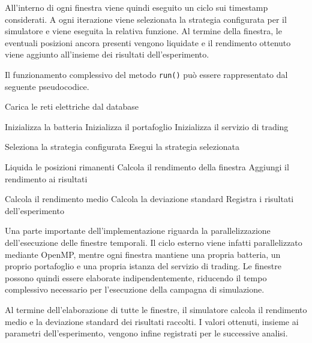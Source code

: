 \documentclass[a4paper,oneside,italian]{sapthesis}
\begin{document}
All'interno di ogni finestra viene quindi eseguito un ciclo sui timestamp
considerati. A ogni iterazione viene selezionata la strategia configurata
per il simulatore e viene eseguita la relativa funzione. Al termine della
finestra, le eventuali posizioni ancora presenti vengono liquidate e il
rendimento ottenuto viene aggiunto all'insieme dei risultati dell'esperimento.

Il funzionamento complessivo del metodo \texttt{run()} può essere
rappresentato dal seguente pseudocodice.

\begin{algorithm}[H]
\caption{Esecuzione della simulazione}
\label{alg:simulator-run}
\begin{algorithmic}[1]

\State Carica le reti elettriche dal database

    \State Inizializza la batteria
    \State Inizializza il portafoglio
    \State Inizializza il servizio di trading

        \State Seleziona la strategia configurata
        \State Esegui la strategia selezionata
    \EndFor

    \State Liquida le posizioni rimanenti
    \State Calcola il rendimento della finestra
    \State Aggiungi il rendimento ai risultati
\EndFor

\State Calcola il rendimento medio
\State Calcola la deviazione standard
\State Registra i risultati dell'esperimento

\end{algorithmic}
\end{algorithm}

Una parte importante dell'implementazione riguarda la parallelizzazione
dell'esecuzione delle finestre temporali. Il ciclo esterno viene infatti
parallelizzato mediante OpenMP, mentre ogni finestra mantiene una propria
batteria, un proprio portafoglio e una propria istanza del servizio di
trading. Le finestre possono quindi essere elaborate indipendentemente,
riducendo il tempo complessivo necessario per l'esecuzione della campagna
di simulazione.

Al termine dell'elaborazione di tutte le finestre, il simulatore calcola il
rendimento medio e la deviazione standard dei risultati raccolti. I valori
ottenuti, insieme ai parametri dell'esperimento, vengono infine registrati
per le successive analisi.
\end{document}
